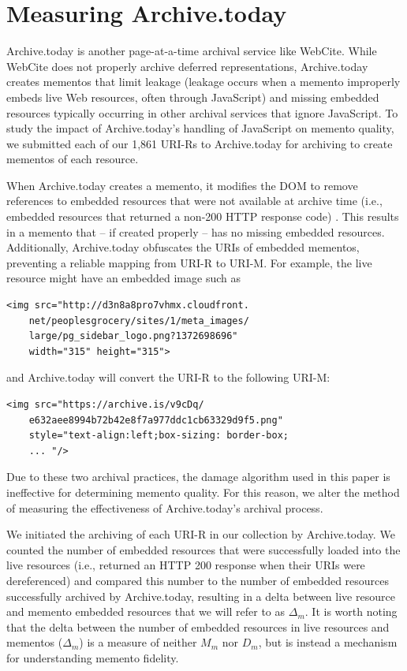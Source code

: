 \section{Measuring Archive.today}
\label{archivetoday}
Archive.today \cite{archivetoday} is another page-at-a-time archival service like WebCite. While WebCite does not properly archive deferred representations, Archive.today creates mementos that limit leakage \cite{zombies, archiveisblog} (leakage occurs when a memento improperly embeds live Web resources, often through JavaScript) and missing embedded resources typically occurring in other archival services that ignore JavaScript. To study the impact of Archive.today's handling of JavaScript on memento quality, we submitted each of our 1,861 URI-Rs to Archive.today for archiving to create mementos of each resource. 

When Archive.today creates a memento, it modifies the DOM to remove references to embedded resources that were not available at archive time (i.e., embedded resources that returned a non-200 HTTP response code) \cite{refreshZombies}. This results in a memento that -- if created properly -- has no missing embedded resources. Additionally, Archive.today obfuscates the URIs of embedded mementos, preventing a reliable mapping from URI-R to URI-M. For example, the live resource might have an embedded image such as

\begin{verbatim}
<img src="http://d3n8a8pro7vhmx.cloudfront.
	net/peoplesgrocery/sites/1/meta_images/
	large/pg_sidebar_logo.png?1372698696" 
	width="315" height="315"> 
\end{verbatim}

\noindent and Archive.today will convert the URI-R to the following URI-M:

\begin{verbatim}
<img src="https://archive.is/v9cDq/
	e632aee8994b72b42e8f7a977ddc1cb63329d9f5.png" 
	style="text-align:left;box-sizing: border-box;
	... "/>
\end{verbatim}

Due to these two archival practices, the damage algorithm used in this paper is ineffective for determining memento quality. For this reason, we alter the method of measuring the effectiveness of Archive.today's archival process. 

We initiated the archiving of each URI-R in our collection by Archive.today. We counted the number of embedded resources that were successfully loaded into the live resources (i.e., returned an HTTP 200 response when their URIs were dereferenced) and compared this number to the number of embedded resources successfully archived by Archive.today, resulting in a delta between live resource and memento embedded resources that we will refer to as $\Delta_m$. It is worth noting that the delta between the number of embedded resources in live resources and mementos ($\Delta_m$) is a measure of neither $M_m$ nor $D_m$, but is instead a mechanism for understanding memento fidelity. 

